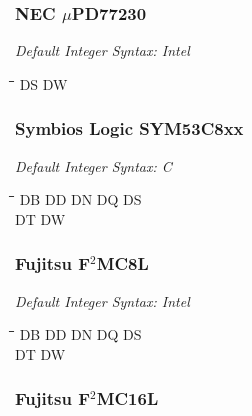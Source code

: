 \subsubsection{NEC $\mu$PD77230}

{\em Default Integer Syntax: Intel}

{\tt\begin{tabbing} 
\hspace{3cm}\=\hspace{3cm}\=\hspace{3cm}\=\hspace{3cm}\=\kill
DS         \> DW \\
\end{tabbing}}

\subsubsection{Symbios Logic SYM53C8xx}

{\em Default Integer Syntax: C}

{\tt\begin{tabbing} 
\hspace{3cm}\=\hspace{3cm}\=\hspace{3cm}\=\hspace{3cm}\=\kill
DB         \> DD          \> DN          \> DQ          \> DS \\
DT         \> DW \\
\end{tabbing}}

\subsubsection{Fujitsu F$^{2}$MC8L}

{\em Default Integer Syntax: Intel}

{\tt\begin{tabbing} 
\hspace{3cm}\=\hspace{3cm}\=\hspace{3cm}\=\hspace{3cm}\=\kill
DB         \> DD          \> DN          \> DQ          \> DS \\
DT         \> DW \\
\end{tabbing}}

\subsubsection{Fujitsu F$^{2}$MC16L}


